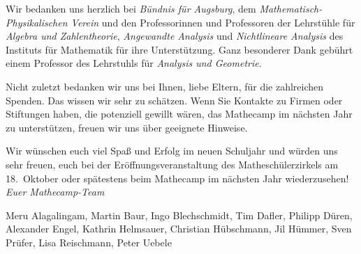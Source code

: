 \documentclass[12pt]{zettel}
\newif\ifmore\moretrue
\begin{document}
Wir bedanken uns herzlich bei \emph{Bündnis für Augsburg}, dem
\emph{Mathematisch-Physikalischen Verein} und den Professorinnen und
Professoren der Lehrstühle für \emph{Algebra und Zahlentheorie},
\emph{Angewandte Analysis} und \emph{Nichtlineare Analysis} des Instituts für
Mathematik für ihre Unterstützung.
Ganz besonderer Dank gebührt einem Professor des
Lehrstuhls für \emph{Analysis und Geometrie}.

Nicht zuletzt bedanken wir uns bei Ihnen, liebe Eltern, für die zahlreichen
Spenden. Das wissen wir sehr zu schätzen.
Wenn Sie Kontakte zu Firmen oder Stiftungen haben, die potenziell gewillt
wären, das Mathecamp im nächsten Jahr zu unterstützen, freuen wir uns über
geeignete Hinweise.

Wir wünschen euch viel Spaß und Erfolg im neuen Schuljahr und würden uns
sehr freuen, euch bei der Eröffnungsveranstaltung des Matheschülerzirkels am
18.~Oktober oder spätestens beim Mathecamp im nächsten Jahr wiederzusehen!
\emph{Euer Mathecamp-Team}

{\small Meru Alagalingam, Martin Baur, Ingo Blechschmidt, Tim Dafler, Philipp Düren,
Alexander Engel, Kathrin Helmsauer,
Christian Hübschmann, Jil Hümmer, Sven Prüfer,
Lisa Reischmann, Peter Uebele}

\newpage

\fi
\ifmore\repeat

\closein\quelle
\end{document}
